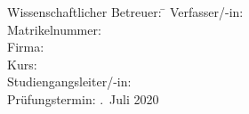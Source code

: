 \begin{titlepage}
\begin{center}
\begin{minipage}{\textwidth}
\begin{tabbing}
	Wissenschaftlicher Betreuer: \hspace{0.85cm}\=\kill
	Verfasser/-in: \> \DerAutorDerArbeit \\[1.5mm]
	Matrikelnummer: \> \Matrikelnummer \\[1.5mm]
	Firma: \> \DerNameDerFirma  \\[1.5mm]
	Kurs: \> \DieKursbezeichnung \\[1.5mm]
	Studiengangsleiter/-in: \> \Studiengangsleitung \\[1.5mm]
	Prüfungstermin: .~Juli 2020
\end{tabbing}
\end{minipage}

\end{center}

\end{titlepage}